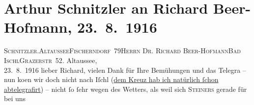 

         
         \renewcommand{\erwaehntePersonen}{Personen: Richard Beer-Hofmann, Arthur Kaufmann, Olga Schnitzler, Franz Steiner, Margit Steiner, Elisabeth Steinrück}
         \renewcommand{\erwaehnteOrte}{Orte: Altaussee, Bad Ischl, Fischerndorf, Goldenes Kreuz, Grazer Straße, Partenkirchen, Salzburg}
         \renewcommand{\erwaehnteWerke}{}
               \section[Arthur Schnitzler an Richard Beer-Hofmann, 23. 8. 1916]{ Arthur Schnitzler an Richard Beer-Hofmann, 23. 8. 1916}\nopagebreak{}\rehead{ }\begin{ledgroupsized}[t]{13cm}\normalsize\beginnumbering \toendnotes[C]{\smallbreak\pagebreak[2]} 
\toendnotes[C]{\smallbreak}\pstart{}{\pb}\textsc{Schnitzler}.\pend{}\pstart{}\textsc{Altaussee}\pend{}\pstart{}\textsc{Fischerndorf 79}\pend{}{\bigskip}\pstart{}\textsc{Herrn Dr. Richard Beer-Hofmann}\pend{}\pstart{}\textsc{Bad Ischl}\pend{}\pstart{}\textsc{Grazerstr 52}.\pend{}{\bigskip}\pstart
           \raggedleft{}{\pb}Altaussee,{\\}23. 8. 1916\pend
           \pstart
           lieber Richard, vielen Dank für Ihre Bemühungen und das Telegra{\geminationm} – nun ko{\geminationm}en wir doch
               nicht nach Iſchl (\uline{dem Kreuz hab ich natürlich ſchon abtelegrafirt}) –
               nicht ſo ſehr wegen des Wetters, als weil sich \textsc{Steiners} gerade für \label{K_L02239-1v}\label{K_L02239-1h} bei uns

\end{ledgroupsized}
